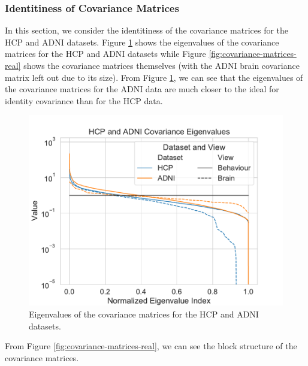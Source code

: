 \subsubsection{Identitiness of Covariance Matrices}
In this section, we consider the identitiness of the covariance matrices for the HCP and ADNI datasets.
Figure \ref{fig:covariance-eigenvalues-real} shows the eigenvalues of the covariance matrices for the HCP and ADNI datasets while Figure \ref{fig:covariance-matrices-real} shows the covariance matrices themselves (with the ADNI brain covariance matrix left out due to its size).
From Figure \ref{fig:covariance-eigenvalues-real}, we can see that the eigenvalues of the covariance matrices for the ADNI data are much closer to the ideal for identity covariance than for the HCP data.
\begin{figure}
\centering
\includegraphics[width=0.8\linewidth]{figures/covariance/hcp_adni_covariance_eigenvalues}
\caption{Eigenvalues of the covariance matrices for the HCP and ADNI datasets.}\label{fig:covariance-eigenvalues-real}
\end{figure}

From Figure \ref{fig:covariance-matrices-real}, we can see the block structure of the covariance matrices.

